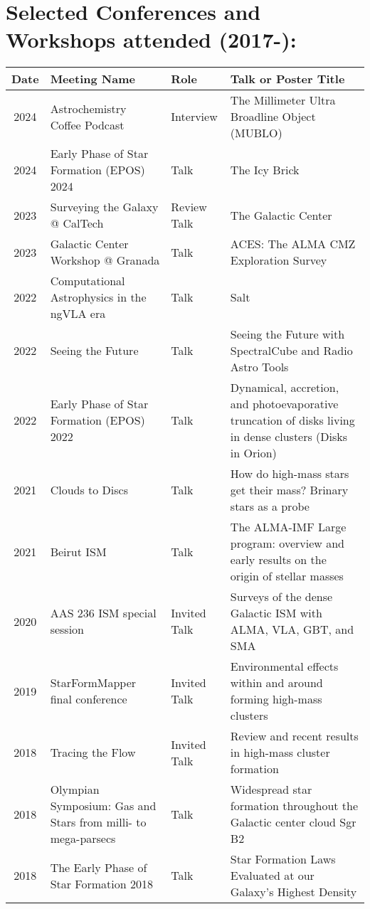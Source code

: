 \clearpage
\setlength{\extrarowheight}{4pt}
\section*{Selected Conferences and Workshops attended (2017-): }
\vspace{-12pt}
\begin{tabular}{cp{1.8in}p{1.5cm}p{3.0in}}
    Date & Meeting Name & Role & Talk or Poster Title \\
                \hline
    2024 &      Astrochemistry Coffee Podcast & Interview &  The Millimeter Ultra Broadline Object (MUBLO) \\
    2024 &      Early Phase of Star Formation (EPOS) 2024 & Talk &  The Icy Brick \\
    2023 &      Surveying the Galaxy @ CalTech & Review Talk & The Galactic Center \\
    2023 &      Galactic Center Workshop @ Granada & Talk & ACES: The ALMA CMZ Exploration Survey \\
    2022 &      Computational Astrophysics in the ngVLA era & Talk & Salt \\
    2022 &      Seeing the Future & Talk & Seeing the Future with SpectralCube and Radio Astro Tools \\
    2022 &      Early Phase of Star Formation (EPOS) 2022 & Talk &  Dynamical, accretion, and photoevaporative truncation of disks living in dense clusters (Disks in Orion)\\
    2021 &      Clouds to Discs & Talk & How do high-mass stars get their mass? Brinary stars as a probe \\
    2021 &      Beirut ISM & Talk & The ALMA-IMF Large program: overview and early results on the origin of stellar masses \\
    2020 &      AAS 236 ISM special session & Invited Talk &  Surveys of the dense Galactic ISM with ALMA, VLA, GBT, and SMA \\
    2019 &      StarFormMapper final conference & Invited Talk & Environmental effects within and around forming high-mass clusters \\
    2018 &      Tracing the Flow & Invited Talk & Review and recent results in high-mass cluster formation \\
    2018 &      Olympian Symposium: Gas and Stars from milli- to mega-parsecs & Talk & 	Widespread star formation throughout the Galactic center cloud Sgr B2 \\
    2018 &      The Early Phase of Star Formation 2018 & Talk & Star Formation Laws Evaluated at our Galaxy's Highest Density \\

\end{tabular}
